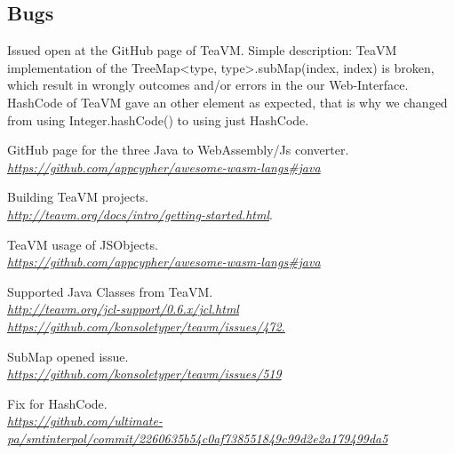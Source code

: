 \documentclass[12pt]{article}
\begin{document}
\subsection{Bugs}
Issued open at the GitHub page\cite{5} of TeaVM. Simple description: TeaVM implementation of the TreeMap<type, type>.subMap(index, index) is broken, which result in wrongly outcomes and/or errors in the our Web-Interface. \\

HashCode of TeaVM gave an other element as expected, that is why we changed from using Integer.hashCode() to using just HashCode\cite{6}.

\medskip

\begin{thebibliography}{9}
GitHub page for the three Java to WebAssembly/Js converter. 
\\\textit{\href{https://github.com/appcypher/awesome-wasm-langs\#java}{https://github.com/appcypher/awesome-wasm-langs\#java}}

Building TeaVM projects. 
\\\textit{\href{http://teavm.org/docs/intro/getting-started.html}{http://teavm.org/docs/intro/getting-started.html}}.

TeaVM usage of JSObjects.
\\\textit{\href{https://github.com/appcypher/awesome-wasm-langs\#java}{https://github.com/appcypher/awesome-wasm-langs\#java}}

Supported Java Classes from TeaVM.
\\\textit{\href{http://teavm.org/jcl-support/0.6.x/jcl.html}{ http://teavm.org/jcl-support/0.6.x/jcl.html} \\ \href{https://github.com/konsoletyper/teavm/issues/472}{ https://github.com/konsoletyper/teavm/issues/472.}}

SubMap opened issue.
\\\textit{\href{https://github.com/konsoletyper/teavm/issues/519}{https://github.com/konsoletyper/teavm/issues/519}}

Fix for HashCode.
\\\textit{\href{https://github.com/ultimate-pa/smtinterpol/commit/2260635b54c0af738551849c99d2e2a179499da5}{https://github.com/ultimate-pa/smtinterpol/commit/2260635b54c0af738551849c99d2e2a179499da5}}

\end{thebibliography}
\end{document}
